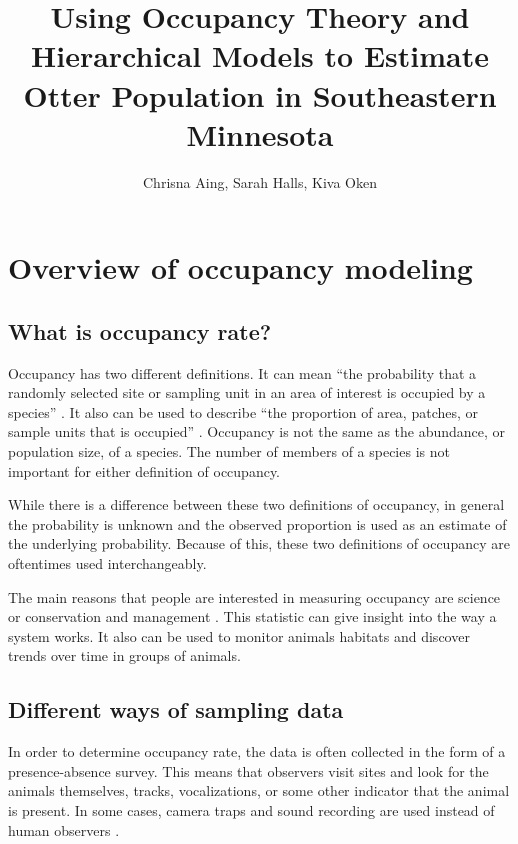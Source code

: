 \documentclass[12pt]{article}
\begin{document}
\title{Using Occupancy Theory and Hierarchical Models to Estimate Otter
Population in Southeastern Minnesota}
\date{}
\author{Chrisna Aing, Sarah Halls, Kiva Oken}
\maketitle

\section{Overview of occupancy modeling}

    \subsection{What is occupancy rate?}
    Occupancy has two different definitions. It can mean ``the probability that
    a randomly selected site or sampling unit in an area of interest is occupied
    by a species'' \cite{MacKenzie2006}. It also can be used to describe ``the
    proportion of area, patches, or sample units that is occupied''
    \cite{MacKenzie2006}. Occupancy is not the same as the abundance, or
    population size, of a species. The number of members of a species is not
    important for either definition of occupancy.

    While there is a difference between these two definitions of occupancy, in
    general the probability is unknown and the observed proportion is used as an
    estimate of the underlying probability. Because of this, these two
    definitions of occupancy are oftentimes used interchangeably.

    The main reasons that people are interested in measuring occupancy are
    science or conservation and management \cite{MacKenzie2006}. This statistic
    can give insight into the way a system works. It also can be used to monitor
    animals habitats and discover trends over time in groups of animals.

	
    \subsection{Different ways of sampling data}
    In order to determine occupancy rate, the data is often collected in the
    form of a presence-absence survey. This means that observers visit sites and
    look for the animals themselves, tracks, vocalizations, or some other
    indicator that the animal is present. In some cases, camera traps and sound
    recording are used instead of human observers \cite{MacKenzie2006}.
\end{document}
